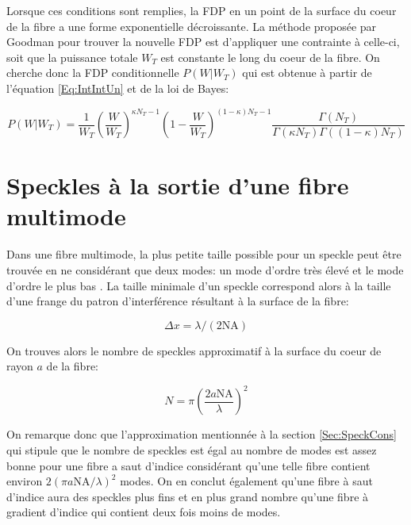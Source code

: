 \documentclass{article}       %
\begin{document}
\bigskip

Lorsque ces conditions sont remplies, la FDP en un point de la surface du coeur de la fibre a une forme exponentielle décroissante. La méthode proposée par Goodman pour trouver la nouvelle FDP est d'appliquer une contrainte à celle-ci, soit que la puissance totale $W_T$ est constante le long du coeur de la fibre. On cherche donc la FDP conditionnelle $P(W|W_T)$ qui est obtenue à partir de l'équation \ref{Eq:IntIntUn} et de la loi de Bayes:

\begin{equation*}
    P(W|W_T) = \frac{1}{W_T}\left(\frac{W}{W_T}\right)^{\kappa N_{T}-1}\left(1-\frac{W}{W_T}\right)^{(1-\kappa)N_{T}-1}\frac{\Gamma(N_{T})}{\Gamma(\kappa N_{T})\Gamma((1-\kappa)N_{T})}
\end{equation*}

\bigskip
\bigskip

\section{Speckles à la sortie d'une fibre multimode}

Dans une fibre multimode, la plus petite taille possible pour un speckle peut être trouvée en ne considérant que deux modes: un mode d'ordre très élevé et le mode d'ordre le plus bas \cite{FiberStats}. La taille minimale d'un speckle correspond alors à la taille d'une frange du patron d'interférence résultant à la surface de la fibre:

\begin{equation*}
    \Delta x = \lambda/(2\text{NA})
\end{equation*}

On trouves alors le nombre de speckles approximatif à la surface du coeur de rayon $a$ de la fibre:

\begin{equation*}
    N = \pi\left(\frac{2a\text{NA}}{\lambda}\right)^2
\end{equation*}

On remarque donc que l'approximation mentionnée à la section \ref{Sec:SpeckCons} qui stipule que le nombre de speckles est égal au nombre de modes est assez bonne pour une fibre a saut d'indice considérant qu'une telle fibre contient environ $2(\pi a\text{NA}/\lambda)^2$ modes. On en conclut également qu'une fibre à saut d'indice aura des speckles plus fins et en plus grand nombre qu'une fibre à gradient d'indice qui contient deux fois moins de modes.
\end{document}
